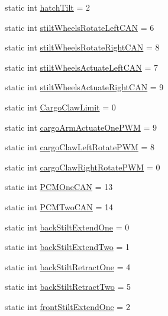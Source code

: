 \begin{DoxyCompactItemize}
\item 
static int \hyperlink{classfrc_1_1robot_1_1_robot_map_a0c656cb43ea0fd37d6b94991e8473bf9}{hatch\+Tilt} = 2
\item 
static int \hyperlink{classfrc_1_1robot_1_1_robot_map_a207ae1f0df88fd16e01e6cb1b99f5208}{stilt\+Wheels\+Rotate\+Left\+C\+AN} = 6
\item 
static int \hyperlink{classfrc_1_1robot_1_1_robot_map_ab522f4712e7ed6ca72dc978e324fdc3e}{stilt\+Wheels\+Rotate\+Right\+C\+AN} = 8
\item 
static int \hyperlink{classfrc_1_1robot_1_1_robot_map_a49ce156a9e6ef017c0c6ebfead8998ad}{stilt\+Wheels\+Actuate\+Left\+C\+AN} = 7
\item 
static int \hyperlink{classfrc_1_1robot_1_1_robot_map_a8ff2304f39bd99c3b9705aa9977f21c2}{stilt\+Wheels\+Actuate\+Right\+C\+AN} = 9
\item 
static int \hyperlink{classfrc_1_1robot_1_1_robot_map_a42ebc770489a95382644455c79dfb3c6}{Cargo\+Claw\+Limit} = 0
\item 
static int \hyperlink{classfrc_1_1robot_1_1_robot_map_aaff9d0adef8e1f97db2ac47f985f044a}{cargo\+Arm\+Actuate\+One\+P\+WM} = 9
\item 
static int \hyperlink{classfrc_1_1robot_1_1_robot_map_aa5824f279bf68bbd68ae1ea3087c4b67}{cargo\+Claw\+Left\+Rotate\+P\+WM} = 8
\item 
static int \hyperlink{classfrc_1_1robot_1_1_robot_map_a108c3b97c541e7ed5a152cea66981231}{cargo\+Claw\+Right\+Rotate\+P\+WM} = 0
\item 
static int \hyperlink{classfrc_1_1robot_1_1_robot_map_a79a848df56d706c787d9a4f9a0434e7f}{P\+C\+M\+One\+C\+AN} = 13
\item 
static int \hyperlink{classfrc_1_1robot_1_1_robot_map_a1667413e090171add7254ea3ada3a786}{P\+C\+M\+Two\+C\+AN} = 14
\item 
static int \hyperlink{classfrc_1_1robot_1_1_robot_map_a6b076d1f5509d27622dd6119d0cf87df}{back\+Stilt\+Extend\+One} = 0
\item 
static int \hyperlink{classfrc_1_1robot_1_1_robot_map_a8ca652cb3d064af4fa63e10d5f8a61ea}{back\+Stilt\+Extend\+Two} = 1
\item 
static int \hyperlink{classfrc_1_1robot_1_1_robot_map_a8747738291bc40d22cac88f94783fc94}{back\+Stilt\+Retract\+One} = 4
\item 
static int \hyperlink{classfrc_1_1robot_1_1_robot_map_a592884e36a4a4183b06712642911af62}{back\+Stilt\+Retract\+Two} = 5
\item 
static int \hyperlink{classfrc_1_1robot_1_1_robot_map_ac82bec623ae333203544bc6e2b6affca}{front\+Stilt\+Extend\+One} = 2

\end{DoxyCompactItemize}
